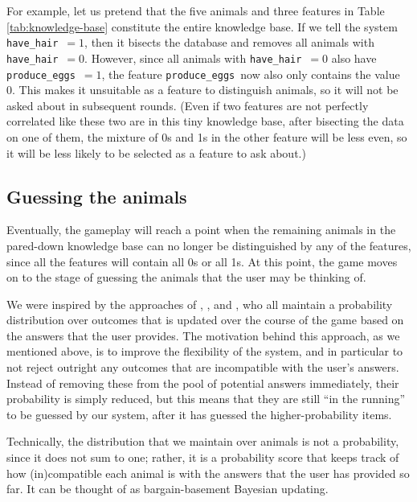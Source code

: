 \documentclass[11pt,a4paper]{article}
\newcommand{\havehair}{\texttt{have\_hair}}
\newcommand{\produceeggs}{\texttt{produce\_eggs}}
\begin{document}
{For example, let us pretend that the five animals and three features in Table \ref{tab:knowledge-base} constitute the entire knowledge base.
If we tell the system \havehair\ $= 1$, then it bisects the database and removes all animals with \havehair\ $= 0$.
However, since all animals with \havehair\ $= 0$ also have \produceeggs\ $= 1$, the feature \produceeggs\ now also only contains the value 0.
This makes it unsuitable as a feature to distinguish animals, so it will not be asked about in subsequent rounds.
(Even if two features are not perfectly correlated like these two are in this tiny knowledge base, after bisecting the data on one of them, the mixture of 0s and 1s in the other feature will be less even, so it will be less likely to be selected as a feature to ask about.)

\subsection{Guessing the animals}
\label{subsec:guess-animals}

Eventually, the gameplay will reach a point when the remaining animals in the pared-down knowledge base can no longer be distinguished by any of the features, since all the features will contain all 0s or all 1s.
At this point, the game moves on to the stage of guessing the animals that the user may be thinking of.

We were inspired by the approaches of \citet{DeyEa2019}, \citet{HuEa2018}, and \citet{Burgener2006}, who all maintain a probability distribution over outcomes that is updated over the course of the game based on the answers that the user provides.
The motivation behind this approach, as we mentioned above, is to improve the flexibility of the system, and in particular to not reject outright any outcomes that are incompatible with the user's answers.
Instead of removing these from the pool of potential answers immediately, their probability is simply reduced, but this means that they are still ``in the running'' to be guessed by our system, after it has guessed the higher-probability items.

Technically, the distribution that we maintain over animals is not a probability, since it does not sum to one; rather, it is a probability score that keeps track of how (in)compatible each animal is with the answers that the user has provided so far.
It can be thought of as bargain-basement Bayesian updating.

}
\end{document}
